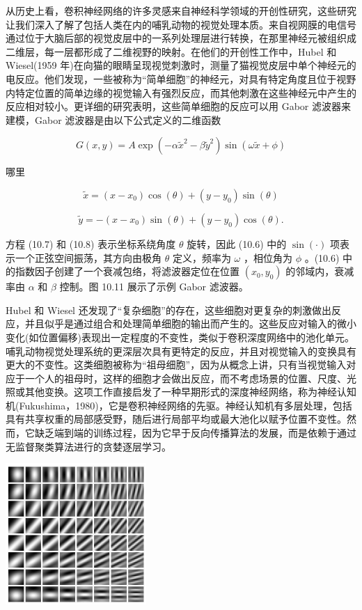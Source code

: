\documentclass[10pt]{article}
\begin{document}
从历史上看，卷积神经网络的许多灵感来自神经科学领域的开创性研究，这些研究让我们深入了解了包括人类在内的哺乳动物的视觉处理本质。来自视网膜的电信号通过位于大脑后部的视觉皮层中的一系列处理层进行转换，在那里神经元被组织成二维层，每一层都形成了二维视野的映射。在他们的开创性工作中，Hubel 和 Wiesel(1959 年)在向猫的眼睛呈现视觉刺激时，测量了猫视觉皮层中单个神经元的电反应。他们发现，一些被称为“简单细胞”的神经元，对具有特定角度且位于视野内特定位置的简单边缘的视觉输入有强烈反应，而其他刺激在这些神经元中产生的反应相对较小。更详细的研究表明，这些简单细胞的反应可以用 Gabor 滤波器来建模，Gabor 滤波器是由以下公式定义的二维函数

\[
G\left( {x,y}\right)  = A\exp \left( {-\alpha {\widetilde{x}}^{2} - \beta {\widetilde{y}}^{2}}\right) \sin \left( {\omega \widetilde{x} + \phi }\right)  \tag{10.6}
\]

哪里

\[
\widetilde{x} = \left( {x - {x}_{0}}\right) \cos \left( \theta \right)  + \left( {y - {y}_{0}}\right) \sin \left( \theta \right)  \tag{10.7}
\]

\[
\widetilde{y} =  - \left( {x - {x}_{0}}\right) \sin \left( \theta \right)  + \left( {y - {y}_{0}}\right) \cos \left( \theta \right) . \tag{10.8}
\]

方程 (10.7) 和 (10.8) 表示坐标系绕角度 \(\theta\) 旋转，因此 (10.6) 中的 \(\sin \left( \cdot \right)\) 项表示一个正弦空间振荡，其方向由极角 \(\theta\) 定义，频率为 \(\omega\) ，相位角为 \(\phi\) 。(10.6) 中的指数因子创建了一个衰减包络，将滤波器定位在位置 \(\left( {{x}_{0},{y}_{0}}\right)\) 的邻域内，衰减率由 \(\alpha\) 和 \(\beta\) 控制。图 10.11 展示了示例 Gabor 滤波器。

Hubel 和 Wiesel 还发现了“复杂细胞”的存在，这些细胞对更复杂的刺激做出反应，并且似乎是通过组合和处理简单细胞的输出而产生的。这些反应对输入的微小变化(如位置偏移)表现出一定程度的不变性，类似于卷积深度网络中的池化单元。哺乳动物视觉处理系统的更深层次具有更特定的反应，并且对视觉输入的变换具有更大的不变性。这类细胞被称为“祖母细胞”，因为从概念上讲，只有当视觉输入对应于一个人的祖母时，这样的细胞才会做出反应，而不考虑场景的位置、尺度、光照或其他变换。这项工作直接启发了一种早期形式的深度神经网络，称为神经认知机(Fukushima，1980)，它是卷积神经网络的先驱。神经认知机有多层处理，包括具有共享权重的局部感受野，随后进行局部平均或最大池化以赋予位置不变性。然而，它缺乏端到端的训练过程，因为它早于反向传播算法的发展，而是依赖于通过无监督聚类算法进行的贪婪逐层学习。

\begin{center}
\includegraphics[max width=0.4\textwidth]{images/0194e279-9b28-703a-88f4-c3ac21e2010d_322_916_374_601_605_0.jpg}
\end{center}
\hspace*{3em} 
\end{document}
